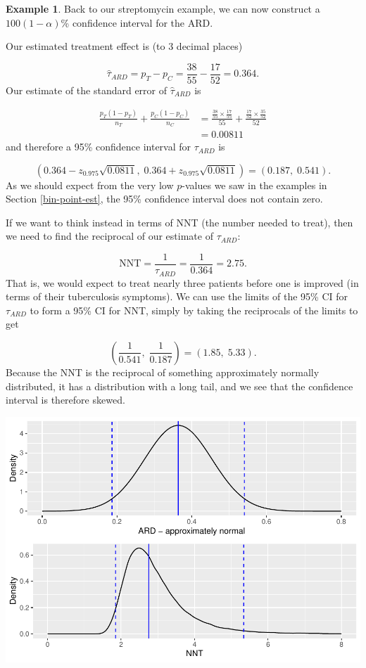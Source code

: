 \documentclass[
  openany]{book}
\theoremstyle{definition}
\theoremstyle{definition}
\newtheorem{example}{Example}[chapter]
\theoremstyle{definition}
\theoremstyle{definition}
\theoremstyle{remark}
\begin{document}
\begin{example}
Back to our streptomycin example, we can now construct a \(100\left(1-\alpha\right)\)\% confidence interval for the ARD.

Our estimated treatment effect is (to 3 decimal places)

\[\hat\tau_{ARD}=p_T - p_C = \frac{38}{55} - \frac{17}{52} = 0.364.\]
Our estimate of the standard error of \(\hat\tau_{ARD}\) is

\[
\begin{aligned}
\frac{p_T\left(1-p_T\right)}{n_T} + \frac{p_C\left(1-p_C\right)}{n_C} & = \frac{\frac{38}{55}\times \frac{17}{55}}{55} + \frac{\frac{17}{52}\times \frac{35}{52}}{52}\\
& = 0.00811
\end{aligned}
\]
and therefore a 95\% confidence interval for \(\tau_{ARD}\) is

\[\left(0.364 - z_{0.975}\sqrt{0.0811},\; 0.364 + z_{0.975}\sqrt{0.0811}\right) = \left(0.187,\; 0.541\right). \]
As we should expect from the very low \(p\)-values we saw in the examples in Section \ref{bin-point-est}, the 95\% confidence interval does not contain zero.

If we want to think instead in terms of NNT (the number needed to treat), then we need to find the reciprocal of our estimate of \(\tau_{ARD}\):

\[ \text{NNT} = \frac{1}{\tau_{ARD}} = \frac{1}{0.364} = 2.75.\]
That is, we would expect to treat nearly three patients before one is improved (in terms of their tuberculosis symptoms). We can use the limits of the 95\% CI for \(\tau_{ARD}\) to form a 95\% CI for NNT, simply by taking the reciprocals of the limits to get

\[\left(\frac{1}{0.541},\; \frac{1}{0.187}\right) = \left(1.85,\; 5.33 \right).\]
Because the NNT is the reciprocal of something approximately normally distributed, it has a distribution with a long tail, and we see that the confidence interval is therefore skewed.

\includegraphics{CT4H_notes_files/figure-latex/unnamed-chunk-26-1.pdf}
\end{example}
\end{document}
